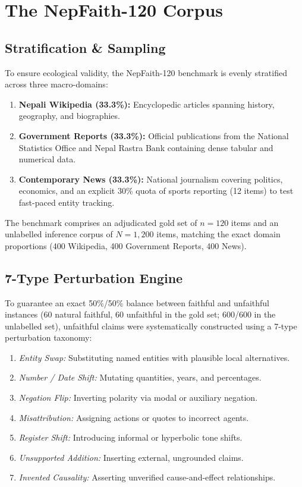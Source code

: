 \documentclass[conference]{IEEEtran}
\begin{document}
\section{The NepFaith-120 Corpus}
\label{sec:corpus}
\subsection{Stratification \& Sampling}
To ensure ecological validity, the NepFaith-120 benchmark is evenly stratified across three macro-domains:
\begin{enumerate}
    \item \textbf{Nepali Wikipedia (33.3\%):} Encyclopedic articles spanning history, geography, and biographies.
    \item \textbf{Government Reports (33.3\%):} Official publications from the National Statistics Office and Nepal Rastra Bank containing dense tabular and numerical data.
    \item \textbf{Contemporary News (33.3\%):} National journalism covering politics, economics, and an explicit 30\% quota of sports reporting (12 items) to test fast-paced entity tracking.
\end{enumerate}

The benchmark comprises an adjudicated gold set of $n=120$ items and an unlabelled inference corpus of $N=1,200$ items, matching the exact domain proportions (400 Wikipedia, 400 Government Reports, 400 News).

\subsection{7-Type Perturbation Engine}
To guarantee an exact 50\%/50\% balance between faithful and unfaithful instances (60 natural faithful, 60 unfaithful in the gold set; 600/600 in the unlabelled set), unfaithful claims were systematically constructed using a 7-type perturbation taxonomy:
\begin{enumerate}
    \item \textit{Entity Swap:} Substituting named entities with plausible local alternatives.
    \item \textit{Number / Date Shift:} Mutating quantities, years, and percentages.
    \item \textit{Negation Flip:} Inverting polarity via modal or auxiliary negation.
    \item \textit{Misattribution:} Assigning actions or quotes to incorrect agents.
    \item \textit{Register Shift:} Introducing informal or hyperbolic tone shifts.
    \item \textit{Unsupported Addition:} Inserting external, ungrounded claims.
    \item \textit{Invented Causality:} Asserting unverified cause-and-effect relationships.
\end{enumerate}
\end{document}
